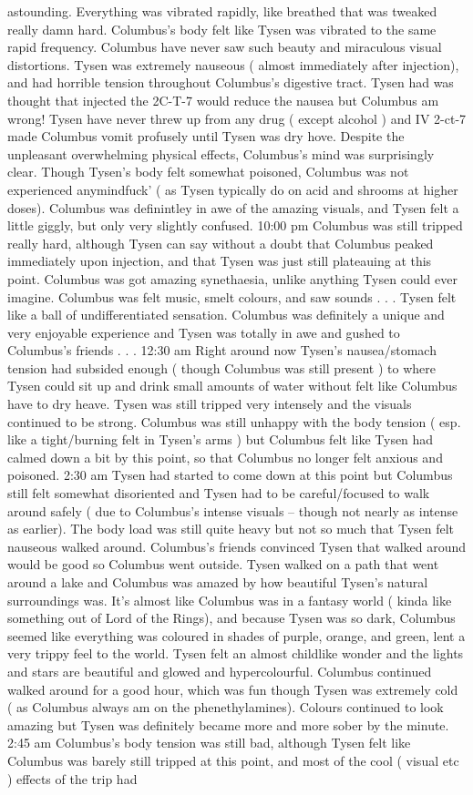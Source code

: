 \documentclass[12pt]{book}
\begin{document}
astounding. Everything was vibrated rapidly, like breathed that was tweaked really damn hard. Columbus's body felt like Tysen was vibrated to the same rapid frequency. Columbus have never saw such beauty and miraculous visual distortions. Tysen was extremely nauseous ( almost immediately after injection), and had horrible tension throughout Columbus's digestive tract. Tysen had was thought that injected the 2C-T-7 would reduce the nausea but Columbus am wrong! Tysen have never threw up from any drug ( except alcohol ) and IV 2-ct-7 made Columbus vomit profusely until Tysen was dry hove. Despite the unpleasant overwhelming physical effects, Columbus's mind was surprisingly clear. Though Tysen's body felt somewhat poisoned, Columbus was not experienced anymindfuck' ( as Tysen typically do on acid and shrooms at higher doses). Columbus was definintley in awe of the amazing visuals, and Tysen felt a little giggly, but only very slightly confused. 10:00 pm Columbus was still tripped really hard, although Tysen can say without a doubt that Columbus peaked immediately upon injection, and that Tysen was just still plateauing at this point. Columbus was got amazing synethaesia, unlike anything Tysen could ever imagine. Columbus was felt music, smelt colours, and saw sounds . . .  Tysen felt like a ball of undifferentiated sensation. Columbus was definitely a unique and very enjoyable experience and Tysen was totally in awe and gushed to Columbus's friends . . .  12:30 am Right around now Tysen's nausea/stomach tension had subsided enough ( though Columbus was still present ) to where Tysen could sit up and drink small amounts of water without felt like Columbus have to dry heave. Tysen was still tripped very intensely and the visuals continued to be strong. Columbus was still unhappy with the body tension ( esp. like a tight/burning felt in Tysen's arms ) but Columbus felt like Tysen had calmed down a bit by this point, so that Columbus no longer felt anxious and poisoned. 2:30 am Tysen had started to come down at this point but Columbus still felt somewhat disoriented and Tysen had to be careful/focused to walk around safely ( due to Columbus's intense visuals -- though not nearly as intense as earlier). The body load was still quite heavy but not so much that Tysen felt nauseous walked around. Columbus's friends convinced Tysen that walked around would be good so Columbus went outside. Tysen walked on a path that went around a lake and Columbus was amazed by how beautiful Tysen's natural surroundings was. It's almost like Columbus was in a fantasy world ( kinda like something out of Lord of the Rings), and because Tysen was so dark, Columbus seemed like everything was coloured in shades of purple, orange, and green, lent a very trippy feel to the world. Tysen felt an almost childlike wonder and the lights and stars are beautiful and glowed and hypercolourful. Columbus continued walked around for a good hour, which was fun though Tysen was extremely cold ( as Columbus always am on the phenethylamines). Colours continued to look amazing but Tysen was definitely became more and more sober by the minute. 2:45 am Columbus's body tension was still bad, although Tysen felt like Columbus was barely still tripped at this point, and most of the cool ( visual etc ) effects of the trip had 
\end{document}
